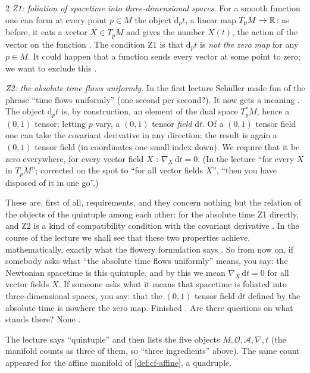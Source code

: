 \begin{paracol}{2}
\emph{Z1: foliation of spacetime into three-dimensional spaces.} For a smooth function one can form at every point $p\in M$ the object $\mathrm d_pt$,
a linear map $T_pM\to\mathbb{R}$: as before, it eats a vector $X\in T_pM$ and gives the number $X(t)$, the action of the vector on the function
. The condition Z1 is that $\mathrm d_pt$ is \emph{not the zero map} for any $p\in M$. It could happen that a function sends every vector at some point to
zero; we want to exclude this .

\emph{Z2: the absolute time flows uniformly.} In the first lecture Schuller made fun of the phrase ``time flows uniformly'' (one second per second?).
It now gets a meaning . The object $\mathrm d_pt$ is, by construction, an element of the dual space $T_p^*M$, hence a $(0,1)$ tensor; letting $p$
vary, a $(0,1)$ tensor \emph{field} $\mathrm dt$. Of a $(0,1)$ tensor field one can take the covariant derivative in any direction; the result is again a
$(0,1)$ tensor field (in coordinates one small index down). We require that it be zero everywhere, for every vector field $X$
: $\nabla_X\,\mathrm dt=0$. (In the lecture ``for every $X$ in $T_pM$''; corrected on the spot to ``for all vector fields $X$'', ``then you have disposed of it in one go''.)

These are, first of all, requirements, and they concern nothing but the relation of the objects of the quintuple among each other: for the
absolute time Z1 directly, and Z2 is a kind of compatibility condition with the covariant derivative . In the course of the lecture we shall see that
these two properties achieve, mathematically, exactly what the flowery formulation says .
So from now on, if somebody asks what ``the absolute time flows uniformly'' means, you say: the Newtonian spacetime is this quintuple, and by this we mean
$\nabla_X\,\mathrm dt=0$ for all vector fields $X$. If someone asks what it means that spacetime is foliated into three-dimensional spaces, you say:
that the $(0,1)$ tensor field $\mathrm dt$ defined by the absolute time is nowhere the zero map. Finished .
Are there questions on what stands there? None .

\begin{secondary}
The lecture says ``quintuple'' and then lists the five objects $M,\mathcal O,\mathcal A,\nabla,t$ (the manifold counts as three of them, so ``three ingredients''
above). The same count appeared for the affine manifold of \cref{def:cf-affine}, a quadruple.
\end{secondary}


\end{paracol}

